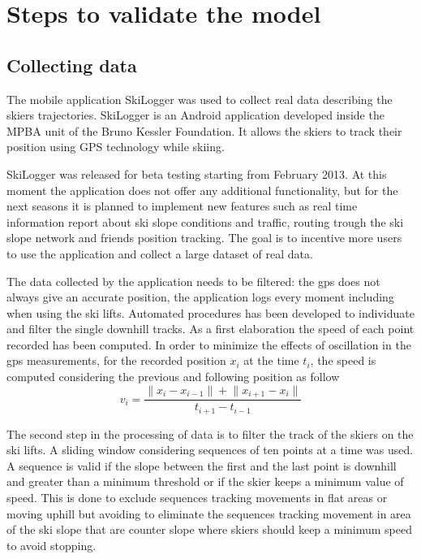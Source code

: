 \documentclass[12pt,a4paper,twoside]{book}
\newcommand{\norm}[1]{\lVert#1\rVert}
\begin{document}
\chapter{Steps to validate the model}\label{steps_validate}
\section{Collecting data}
The mobile application SkiLogger was used to collect real data describing the skiers trajectories. SkiLogger is an Android application developed inside the MPBA unit of the Bruno Kessler Foundation. It allows the skiers to track their position using GPS technology while skiing.

SkiLogger was released for beta testing starting from February 2013. At this moment the application does not offer any additional functionality, but for the next seasons it is planned to implement new features such as real time information report about ski slope conditions and traffic, routing trough the ski slope network and friends position tracking. The goal is to incentive more users to use the application and collect a large dataset of real data.

The data collected by the application needs to be filtered: the gps does not always give an accurate position, the application logs every moment including when using the ski lifts. Automated procedures has been developed to individuate and filter the single downhill tracks. As a first elaboration the speed of each point recorded has been computed. In order to minimize the effects of oscillation in the gps measurements, for the recorded position $x_i$ at the time $t_i$, the speed is computed considering the previous and following position as follow
\begin{equation}
v_i=\frac{\norm{x_i-x_{i-1}}+\norm{x_{i+1}-x_i}}{t_{i+1}-t_{i-1}}
\end{equation}

The second step in the processing of data is to filter the track of the skiers on the ski lifts. A sliding window considering sequences of ten points at a time was used. A sequence is valid if the slope between the first and the last point is downhill and greater than a minimum threshold or if the skier keeps a minimum value of speed. This is done to exclude sequences tracking movements in flat areas or moving uphill but avoiding to eliminate the sequences tracking movement in area of the ski slope that are counter slope where skiers should keep a minimum speed to avoid stopping.
\end{document}
